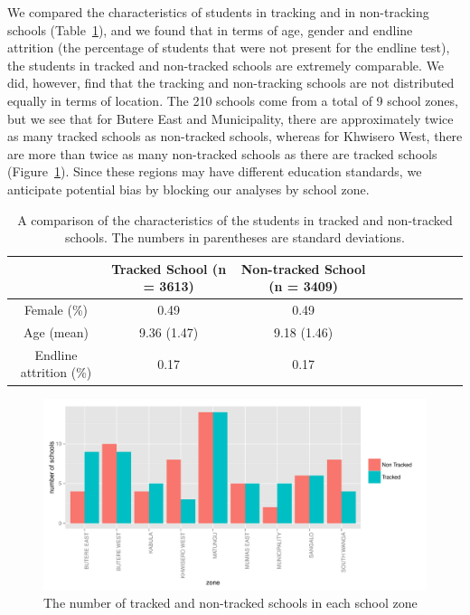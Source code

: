 \documentclass[11pt]{article}
\begin{document}
 We compared the characteristics of students in tracking and in non-tracking schools (Table~\ref{tab:char}), and we found that in terms of age, gender and endline attrition (the percentage of students that were not present for the endline test), the students in tracked and non-tracked schools are extremely comparable. We did, however, find that the tracking and non-tracking schools are not distributed equally in terms of location. The 210 schools come from a total of 9 school zones, but we see that for Butere East and Municipality, there are approximately twice as many tracked schools as non-tracked schools, whereas for Khwisero West, there are more than twice as many non-tracked schools as there are tracked schools (Figure~\ref{fig:zone}).  Since these regions may have different education standards, we anticipate potential bias by blocking our analyses by school zone.
 
 \begin{table}[H]
 \centering
 \begin{tabular}{cccccccccc}
 \hline
 & Tracked School (n = 3613) & Non-tracked School (n = 3409)\\
 \hline
Female (\%) & 0.49 & 0.49\\
Age (mean) & 9.36 (1.47) & 9.18 (1.46)\\
Endline attrition (\%) & 0.17 & 0.17\\ \hline
 \end{tabular}
 \caption{A comparison of the characteristics of the students in tracked and non-tracked schools. The numbers in parentheses are standard deviations.}
 \label{tab:char}
 \end{table} 
 
 \begin{figure}[H]
 \centering
 \includegraphics[scale = 0.6]{school_zones.pdf}
 \caption{The number of tracked and non-tracked schools in each school zone}
 \label{fig:zone}
 \end{figure}
 
\end{document}
